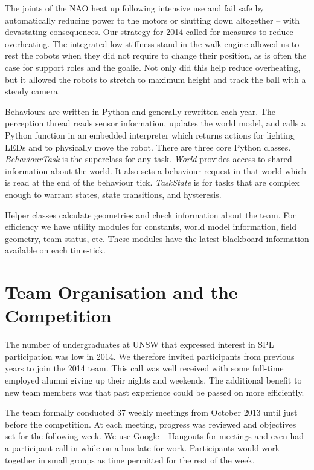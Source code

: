 \documentclass[runningheads,a4paper]{llncs}
\begin{document}
The joints of the NAO heat up following intensive use and fail safe by automatically reducing power to the motors or shutting down altogether -- with devastating consequences. Our strategy for 2014 called for measures to reduce overheating. The integrated low-stiffness stand in the walk engine allowed us to rest the robots when they did not require to change their position, as is often the case for support roles and the goalie. Not only did this help reduce overheating, but it allowed the robots to stretch to maximum height and track the ball with a steady camera. 

Behaviours are written in Python and generally rewritten each year. The perception thread reads sensor information, updates the world model, and calls a Python function in an embedded interpreter which returns actions for lighting LEDs and to physically move the robot. There are three core Python classes. \emph{BehaviourTask} is the superclass for any task. 
\emph{World} provides access to shared information about the world. It also sets a behaviour request in that world which is read at the end of the behaviour tick. \emph{TaskState} is for tasks that are complex enough to warrant states, state transitions, and hysteresis.

Helper classes calculate geometries and check information about the team. For efficiency we have utility modules for constants,  world model information, field geometry, team status, etc. These modules have the latest blackboard information available on each time-tick. 






\section{Team Organisation and the Competition}
The number of undergraduates at UNSW that expressed interest in SPL participation was low in 2014. We therefore invited participants from previous years to join the 2014 team. This call was well received with some full-time employed alumni giving up their nights and weekends. The additional benefit to new team members was that past experience could be passed on more efficiently. 

The team formally conducted 37 weekly meetings from October 2013 until just before the competition. At each meeting, progress was reviewed and objectives set for the following week. We use Google+ Hangouts for meetings and even had a participant call in while on a bus late for work. Participants would work together in small groups as time permitted for the rest of the week. 
\end{document}

